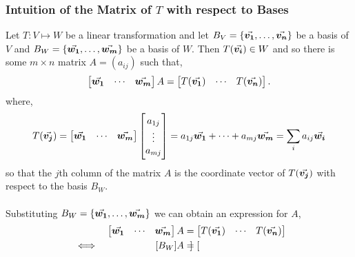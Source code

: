\documentclass[../MathsNotesBase.tex]{subfiles}
\begin{document}
{		\medskip\label{def:matrix_of_lin_transform_wrt_bases}
	
		\medskip
		\subsubsection{Intuition of the Matrix of $T$ with respect to Bases}
		\medskip
		Let ${ T: V \longmapsto W }$ be a linear transformation and let ${ B_V = \{\vec{\bm{v_1}},\dots,\vec{\bm{v_n}}\} }$ be a basis of $V$ and ${ B_W = \{\vec{\bm{w_1}},\dots,\vec{\bm{w_m}}\} }$ be a basis of $W$. Then ${ T(\vec{\bm{v_i}}) \in W }$ and so there is some ${ m \times n }$ matrix ${ A = (a_{ij}) }$ such that,
		\[
			\begin{bmatrix}
			\vec{\bm{w_1}} & \cdots & \vec{\bm{w_m}}
			\end{bmatrix}
			A
			=
			\begin{bmatrix}
			T(\vec{\bm{v_1}}) & \cdots & T(\vec{\bm{v_n}})
			\end{bmatrix}.		
		\]
			where,
		\[ T(\vec{\bm{v_j}}) = 
			\begin{bmatrix}
				\vec{\bm{w_1}} & \cdots & \vec{\bm{w_m}}
			\end{bmatrix}
			\begin{bmatrix}
				a_{1j}\\
				\vdots \\
				a_{mj}
			\end{bmatrix}
					= a_{1j}\vec{\bm{w_1}} + \cdots + a_{mj}\vec{\bm{w_m}} = \sum_i a_{ij}\vec{\bm{w_i}} 
		\]
		so that the $j$th column of the matrix $A$ is the coordinate vector of $T(\vec{\bm{v_j}})$ with respect to the basis $B_W$.\\\\		
		Substituting ${ B_W = \{\vec{\bm{w_1}},\dots,\vec{\bm{w_m}}\} }$ we can obtain an expression for $A$,
		\begin{align*}
		&& \begin{bmatrix}
			\vec{\bm{w_1}} & \cdots & \vec{\bm{w_m}}
			\end{bmatrix}
			A &=
			\begin{bmatrix}
			T(\vec{\bm{v_1}}) & \cdots & T(\vec{\bm{v_n}})
			\end{bmatrix} \\
		&\iff & [B_W]A &= \begin{bmatrix}

\end{bmatrix}
\end{align*}}
\end{document}

